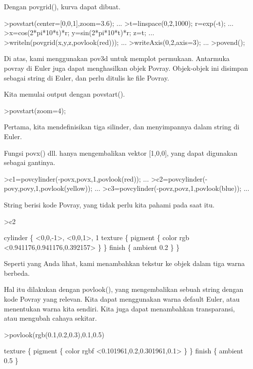\documentclass{article}
\begin{document}
\begin{eulernotebook}
\begin{eulercomment}
\begin{eulercomment}
\begin{eulercomment}
Dengan povgrid(), kurva dapat dibuat.
\end{eulercomment}
\begin{eulerprompt}
>povstart(center=[0,0,1],zoom=3.6); ...
>t=linspace(0,2,1000); r=exp(-t); ...
>x=cos(2*pi*10*t)*r; y=sin(2*pi*10*t)*r; z=t; ...
>writeln(povgrid(x,y,z,povlook(red))); ...
>writeAxis(0,2,axis=3); ...
>povend();
\end{eulerprompt}
\begin{eulercomment}
Di atas, kami menggunakan pov3d untuk memplot permukaan. Antarmuka
povray di Euler juga dapat menghasilkan objek Povray. Objek-objek ini
disimpan sebagai string di Euler, dan perlu ditulis ke file Povray.

Kita memulai output dengan povstart().
\end{eulercomment}
\begin{eulerprompt}
>povstart(zoom=4);
\end{eulerprompt}
\begin{eulercomment}
Pertama, kita mendefinisikan tiga silinder, dan menyimpannya dalam
string di Euler.

Fungsi povx() dll. hanya mengembalikan vektor [1,0,0], yang dapat
digunakan sebagai gantinya.
\end{eulercomment}
\begin{eulerprompt}
>c1=povcylinder(-povx,povx,1,povlook(red)); ...
>c2=povcylinder(-povy,povy,1,povlook(yellow)); ...
>c3=povcylinder(-povz,povz,1,povlook(blue)); ...
\end{eulerprompt}
\begin{eulercomment}
String berisi kode Povray, yang tidak perlu kita pahami pada saat itu.
\end{eulercomment}
\begin{eulerprompt}
>c2
\end{eulerprompt}
\begin{euleroutput}
  cylinder \{ <0,0,-1>, <0,0,1>, 1
   texture \{ pigment \{ color rgb <0.941176,0.941176,0.392157> \}  \} 
   finish \{ ambient 0.2 \} 
   \}
\end{euleroutput}
\begin{eulercomment}
Seperti yang Anda lihat, kami menambahkan tekstur ke objek dalam tiga
warna berbeda.

Hal itu dilakukan dengan povlook(), yang mengembalikan sebuah string
dengan kode Povray yang relevan. Kita dapat menggunakan warna default
Euler, atau menentukan warna kita sendiri. Kita juga dapat menambahkan
transparansi, atau mengubah cahaya sekitar.
\end{eulercomment}
\begin{eulerprompt}
>povlook(rgb(0.1,0.2,0.3),0.1,0.5)
\end{eulerprompt}
\begin{euleroutput}
   texture \{ pigment \{ color rgbf <0.101961,0.2,0.301961,0.1> \}  \} 
   finish \{ ambient 0.5 \} 
  

\end{euleroutput}
\end{eulercomment}
\end{eulercomment}
\end{eulernotebook}
\end{document}
